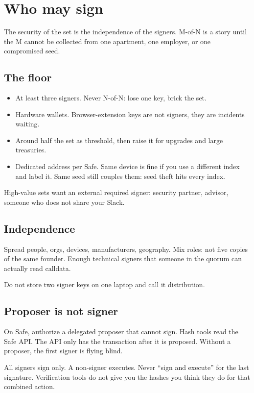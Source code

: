 \chapter{Who may sign}

The security of the set is the independence of the
signers. M-of-N is a story until the M cannot be
collected from one apartment, one employer, or one
compromised seed.

\section{The floor}

\begin{itemize}
  \item At least three signers. Never N-of-N: lose
  one key, brick the set.
  \item Hardware wallets. Browser-extension keys
  are not signers, they are incidents waiting.
  \item Around half the set as threshold, then
  raise it for upgrades and large treasuries.
  \item Dedicated address per Safe. Same device is
  fine if you use a different index and label it.
  Same seed still couples them: seed theft hits
  every index.
\end{itemize}

High-value sets want an external required signer:
security partner, advisor, someone who does not
share your Slack.

\section{Independence}

Spread people, orgs, devices, manufacturers,
geography. Mix roles: not five copies of the same
founder. Enough technical signers that someone in
the quorum can actually read calldata.

Do not store two signer keys on one laptop and
call it distribution.

\section{Proposer is not signer}

On Safe, authorize a delegated proposer that
cannot sign. Hash tools read the Safe API. The API
only has the transaction after it is proposed.
Without a proposer, the first signer is flying
blind.

All signers sign only. A non-signer executes.
Never ``sign and execute'' for the last signature.
Verification tools do not give you the hashes you
think they do for that combined action.

